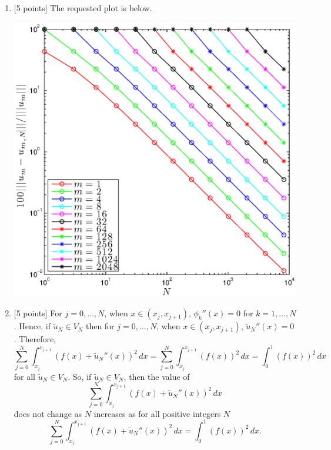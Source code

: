 \begin{solution}
\begin{enumerate}
\item {[5 points]} The requested plot is below.

\begin{center}
\includegraphics[scale=0.75]{hw34c.eps}
\end{center}

\item {[5 points]} For $j=0,\ldots,N$, when $x\in(x_j,x_{j+1})$, $\phi_k''(x)=0$ for $k=1,\ldots,N$. Hence, if $\tilde{u}_N\in V_N$ then for $j=0,\ldots,N$, when $x\in(x_j,x_{j+1})$, $\tilde{u}_N''(x)=0$. Therefore,
\[
\sum_{j=0}^N\int_{x_j}^{x_{j+1}}(f(x)+\tilde{u}_N''(x))^2\,dx=\sum_{j=0}^N\int_{x_j}^{x_{j+1}}(f(x))^2\,dx=\int_0^1(f(x))^2\,dx
\]
for all $\tilde{u}_N\in V_N$. So, if $\tilde{u}_N\in V_N$, then the value of
\[
\sum_{j=0}^N\int_{x_j}^{x_{j+1}}(f(x)+\tilde{u}_N''(x))^2\,dx
\]
does not change as $N$ increases as for all positive integers $N$
\[
\sum_{j=0}^N\int_{x_j}^{x_{j+1}}(f(x)+\tilde{u}_N''(x))^2\,dx=\int_0^1(f(x))^2\,dx.
\]
\end{enumerate}
\end{solution}